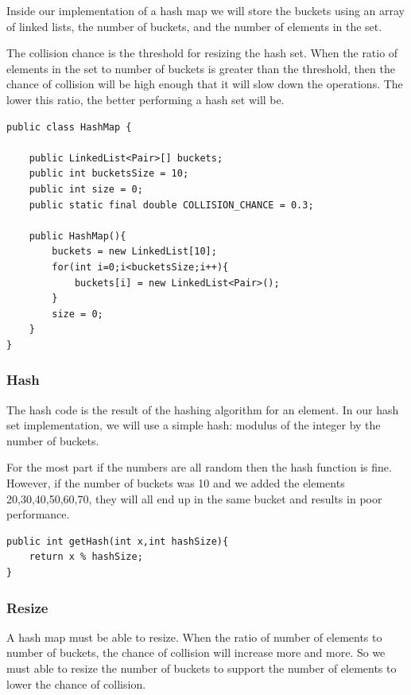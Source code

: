 \documentclass[11pt,oneside]{book}
\begin{document}
Inside our implementation of a hash map we will store the buckets using an array of linked lists, the number of buckets, and the number of elements in the set.

The collision chance is the threshold for resizing the hash set. When the ratio of elements in the set to number of buckets is greater than the threshold, then the chance of collision will be high enough that it will slow down the operations. The lower this ratio, the better performing a hash set will be.

\begin{lstlisting}
public class HashMap {

    public LinkedList<Pair>[] buckets;
    public int bucketsSize = 10;
    public int size = 0;
    public static final double COLLISION_CHANCE = 0.3;
    
    public HashMap(){
        buckets = new LinkedList[10];
        for(int i=0;i<bucketsSize;i++){
            buckets[i] = new LinkedList<Pair>();
        }
        size = 0;
    }
}
\end{lstlisting}

\subsubsection{Hash}

The hash code is the result of the hashing algorithm for an element. In our hash set implementation, we will use a simple hash: modulus of the integer by the number of buckets.

For the most part if the numbers are all random then the hash function is fine. However, if the number of buckets was 10 and we added the elements 20,30,40,50,60,70, they will all end up in the same bucket and results in poor performance.

\begin{lstlisting}
public int getHash(int x,int hashSize){
    return x % hashSize;
}
\end{lstlisting}

\subsubsection{Resize}

A hash map must be able to resize. When the ratio of number of elements to number of buckets, the chance of collision will increase more and more. So we must able to resize the number of buckets to support the number of elements to lower the chance of collision.
\end{document}
